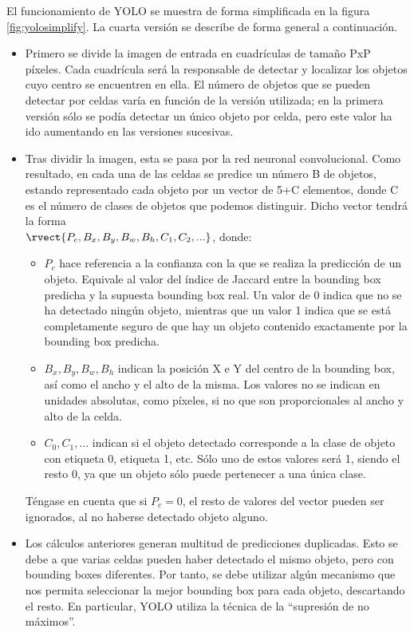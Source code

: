 El funcionamiento de YOLO se muestra de forma simplificada en la figura \ref{fig:yolosimplify}. La cuarta versión \cite{yolov4originalpaper} se describe de forma general a continuación.

\begin{itemize}
    \item Primero se divide la imagen de entrada en cuadrículas de tamaño PxP píxeles. Cada cuadrícula será la responsable de detectar y localizar los objetos cuyo centro se encuentren en ella. El número de objetos que se pueden detectar por celdas varía en función de la versión utilizada; en la primera versión sólo se podía detectar un único objeto por celda, pero este valor ha ido aumentando en las versiones sucesivas.
    \item Tras dividir la imagen, esta se pasa por la red neuronal convolucional. Como resultado, en cada una de las celdas se predice un número B de objetos, estando representado cada objeto por un vector de 5+C elementos, donde C es el número de clases de objetos que podemos distinguir. Dicho vector tendrá la forma \\ $\rvect{P_c,B_x, B_y,B_w,B_h,C_1,C_2,...}$, donde:
    \begin{itemize}
        \item $P_c$ hace referencia a la confianza con la que se realiza la predicción de un objeto. Equivale al valor del índice de Jaccard entre la bounding box predicha y la supuesta bounding box real. Un valor de 0 indica que no se ha detectado ningún objeto, mientras que un valor 1 indica que se está completamente seguro de que hay un objeto contenido exactamente por la bounding box predicha.
        \item $B_x, B_y, B_w, B_h$ indican la posición X e Y del centro de la bounding box, así como el ancho y el alto de la misma. Los valores no se indican en unidades absolutas, como píxeles, si no que son proporcionales al ancho y alto de la celda.
        \item $C_0, C_1, ...$ indican si el objeto detectado corresponde a la clase de objeto con etiqueta 0, etiqueta 1, etc. Sólo uno de estos valores será 1, siendo el resto 0, ya que un objeto sólo puede pertenecer a una única clase.
    \end{itemize}
    Téngase en cuenta que si $P_c = 0$, el resto de valores del vector pueden ser ignorados, al no haberse detectado objeto alguno.
    \item Los cálculos anteriores generan multitud de predicciones duplicadas. Esto se debe a que varias celdas pueden haber detectado el mismo objeto, pero con bounding boxes diferentes. Por tanto, se debe utilizar algún mecanismo que nos permita seleccionar la mejor bounding box para cada objeto, descartando el resto. En particular, YOLO utiliza la técnica de la ``supresión de no máximos''.  

\end{itemize}
